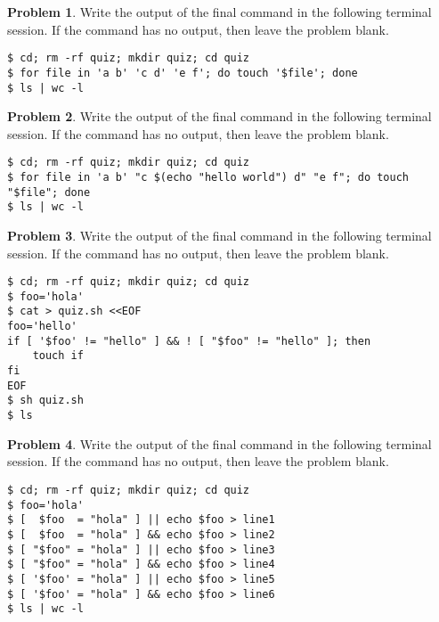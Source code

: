 \documentclass[10pt]{article}
\theoremstyle{definition}
\newtheorem{problem}{Problem}
\begin{document}
\filbreak\begin{problem}
    Write the output of the final command in the following terminal session.
    If the command has no output, then leave the problem blank.
\end{problem}
\begin{lstlisting}
$ cd; rm -rf quiz; mkdir quiz; cd quiz
$ for file in 'a b' 'c d' 'e f'; do touch '$file'; done
$ ls | wc -l
\end{lstlisting}
\vspace{1in}

\filbreak\begin{problem}
    Write the output of the final command in the following terminal session.
    If the command has no output, then leave the problem blank.
\end{problem}
\begin{lstlisting}
$ cd; rm -rf quiz; mkdir quiz; cd quiz
$ for file in 'a b' "c $(echo "hello world") d" "e f"; do touch "$file"; done
$ ls | wc -l
\end{lstlisting}
\vspace{1in}

\filbreak
\begin{problem}
    Write the output of the final command in the following terminal session.
    If the command has no output, then leave the problem blank.
\end{problem}
\begin{lstlisting}
$ cd; rm -rf quiz; mkdir quiz; cd quiz
$ foo='hola'
$ cat > quiz.sh <<EOF
foo='hello'
if [ '$foo' != "hello" ] && ! [ "$foo" != "hello" ]; then
    touch if
fi
EOF
$ sh quiz.sh
$ ls
\end{lstlisting}
\vspace{2in}

\filbreak
\begin{problem}
    Write the output of the final command in the following terminal session.
    If the command has no output, then leave the problem blank.
\end{problem}
\begin{lstlisting}
$ cd; rm -rf quiz; mkdir quiz; cd quiz
$ foo='hola'
$ [  $foo  = "hola" ] || echo $foo > line1
$ [  $foo  = "hola" ] && echo $foo > line2
$ [ "$foo" = "hola" ] || echo $foo > line3
$ [ "$foo" = "hola" ] && echo $foo > line4
$ [ '$foo' = "hola" ] || echo $foo > line5
$ [ '$foo' = "hola" ] && echo $foo > line6
$ ls | wc -l
\end{lstlisting}
\vspace{2in}
\end{document}
